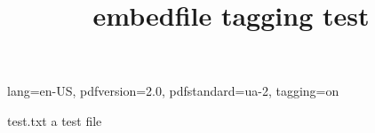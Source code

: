\ifdefined\Uchar\RequirePackage{luatagging}\fi
\DocumentMetadata
  {
    lang=en-US,
    pdfversion=2.0,
    pdfstandard=ua-2,
    tagging=on
  }
\begin{filecontents}{test.txt}
a test file
\end{filecontents}
\documentclass{article}
\usepackage{embedfile}

\title{embedfile tagging test}


text
